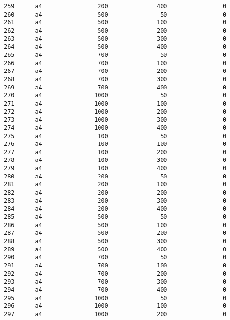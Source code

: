 \documentclass[11pt]{article}
\begin{document}
\begin{Verbatim}[commandchars=\\\{\}]
259      a4                200              400                0   
260      a4                500               50                0   
261      a4                500              100                0   
262      a4                500              200                0   
263      a4                500              300                0   
264      a4                500              400                0   
265      a4                700               50                0   
266      a4                700              100                0   
267      a4                700              200                0   
268      a4                700              300                0   
269      a4                700              400                0   
270      a4               1000               50                0   
271      a4               1000              100                0   
272      a4               1000              200                0   
273      a4               1000              300                0   
274      a4               1000              400                0   
275      a4                100               50                0   
276      a4                100              100                0   
277      a4                100              200                0   
278      a4                100              300                0   
279      a4                100              400                0   
280      a4                200               50                0   
281      a4                200              100                0   
282      a4                200              200                0   
283      a4                200              300                0   
284      a4                200              400                0   
285      a4                500               50                0   
286      a4                500              100                0   
287      a4                500              200                0   
288      a4                500              300                0   
289      a4                500              400                0   
290      a4                700               50                0   
291      a4                700              100                0   
292      a4                700              200                0   
293      a4                700              300                0   
294      a4                700              400                0   
295      a4               1000               50                0   
296      a4               1000              100                0   
297      a4               1000              200                0   

\end{Verbatim}
\end{document}
